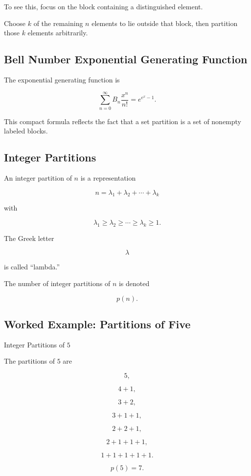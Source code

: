To see this, focus on the block containing a distinguished element.

Choose \(k\) of the remaining \(n\) elements to lie outside that block,
then partition those \(k\) elements arbitrarily.

\subsection{Bell Number Exponential Generating Function}
\label{subsec:bell-number-egf}

The exponential generating function is

\[
\boxed{
\sum_{n=0}^{\infty}
B_n\frac{x^n}{n!}
=
e^{e^x-1}.
}
\]

This compact formula reflects the fact that a set partition is a set of
nonempty labeled blocks.

\subsection{Integer Partitions}
\label{subsec:enumerative-integer-partitions}

An integer partition of \(n\) is a representation

\[
n
=
\lambda_1+\lambda_2+\cdots+\lambda_k
\]

with

\[
\lambda_1\geq\lambda_2\geq\cdots\geq\lambda_k\geq1.
\]

The Greek letter

\[
\lambda
\]

is called ``lambda.''

The number of integer partitions of \(n\) is denoted

\[
\boxed{
p(n).
}
\]

\subsection{Worked Example: Partitions of Five}
\label{subsec:worked-partitions-five}

\begin{workedexamplebox}{Integer Partitions of \(5\)}

The partitions of \(5\) are

\[
5,
\]

\[
4+1,
\]

\[
3+2,
\]

\[
3+1+1,
\]

\[
2+2+1,
\]

\[
2+1+1+1,
\]

\[
1+1+1+1+1.
\]

\begin{answerbox}
\[
\boxed{
p(5)=7.
}
\]
\end{answerbox}

\end{workedexamplebox}

